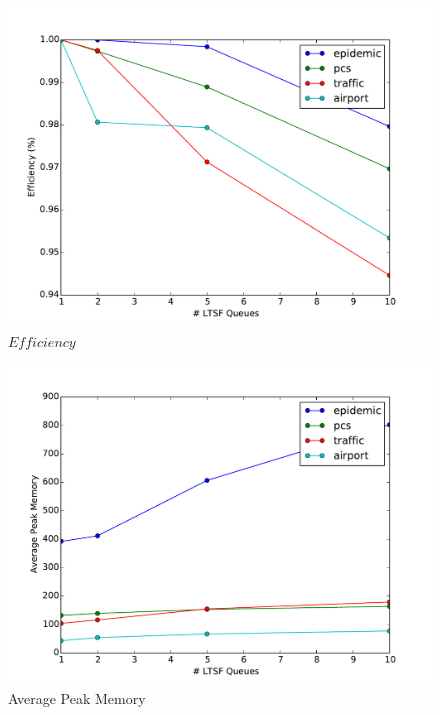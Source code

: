 \documentclass[11pt]{book}
\begin{document}
\begin{figure}
\begin{minipage}{.5\textwidth}
\begin{center}
      \includegraphics[width=\textwidth,keepaspectratio,quiet]{figs/pending_event_set/ltsf_efficiency.pdf} \\
      $Efficiency$ \\
    \end{center}
  \end{minipage}
  \begin{minipage}{.5\textwidth}
    \begin{center}
      \includegraphics[width=\textwidth,keepaspectratio,quiet]{figs/pending_event_set/ltsf_memory.pdf} \\
      Average Peak Memory \\
    \end{center}

\end{minipage}
\end{figure}
\end{document}
